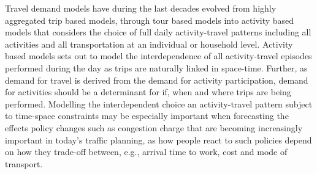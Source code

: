 

Travel demand models have during the last decades evolved from highly aggregated trip based models, through tour based models into activity based models that considers the choice of full daily activity-travel patterns including all activities and all transportation at an individual or household level. Activity based models sets out to model the interdependence of all activity-travel episodes performed during the day as trips are naturally linked in space-time. Further, as demand for travel is derived from the demand for activity participation, demand for activities should be a determinant for if, when and where trips are being performed. Modelling the interdependent choice an activity-travel pattern subject to time-space constraints may be especially important when forecasting the effects policy changes such as congestion charge that are becoming increasingly important in today's traffic planning, as how people react to such policies depend on how they trade-off between, e.g., arrival time to work, cost and mode of transport. 

